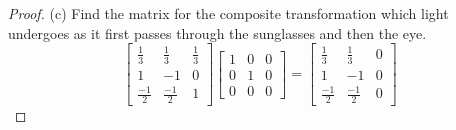 \documentclass[12pt]{article}
\newcommand{\tab}{\\\\}
\begin{document}
\begin{proof}
  \vskip 5pt
  \noindent
  (c) Find the matrix for the composite transformation which light undergoes as it first passes through the sunglasses and then the eye.
  \renewcommand{\arraystretch}{2.5}
  \[
  \begin{bmatrix}
      \frac{1}{3}&  \frac{1}{3}&  \frac{1}{3}\\
      1&-1&0\\
      \frac{-1}{2}&\frac{-1}{2}&1
  \end{bmatrix}
  \begin{bmatrix}
    1&0&0\\0&1&0\\0&0&0
  \end{bmatrix}
  =
  \begin{bmatrix}
    \frac{1}{3}&  \frac{1}{3}&  0\\
    1&-1&0\\
    \frac{-1}{2}&\frac{-1}{2}&0
  \end{bmatrix}
  \]
  \vskip 10pt
  \noindent
\end{proof}\tab\tab
\end{document}
